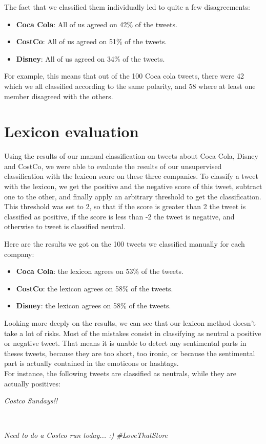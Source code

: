 \documentclass[a4paper,12pt]{report}
\begin{document}
The fact that we classified them individually led to quite a few disagreements:

\begin{itemize}
        \item \textbf{Coca Cola}: All of us agreed on 42\% of the tweets.
        \item \textbf{CostCo}: All of us agreed on 51\% of the tweets.
        \item \textbf{Disney}: All of us agreed on 34\% of the tweets.
\end{itemize}

For example, this means that out of the 100 Coca cola tweets, there were 42 which we all classified according to the same polarity, and 58 where at least one member disagreed with the others.

\section{Lexicon evaluation}

Using the results of our manual classification on tweets about Coca Cola, Disney and CostCo, we were able to evaluate the results of our unsupervised classification with the lexicon score on these three companies.
To classify a tweet with the lexicon, we get the positive and the negative score of this tweet, subtract one to the other, and finally apply an arbitrary threshold to get the classification.
This threshold was set to 2, so that if the score is greater than 2 the tweet is classified as positive, if the score is less than -2 the tweet is negative, and otherwise to tweet is classified neutral.

Here are the results we got on the 100 tweets we classified manually for each company:
\begin{itemize}
        \item \textbf{Coca Cola}: the lexicon agrees on 53\% of the tweets.
        \item \textbf{CostCo}: the lexicon agrees on 58\% of the tweets.
        \item \textbf{Disney}: the lexicon agrees on 58\% of the tweets.
\end{itemize}
Looking more deeply on the results, we can see that our lexicon method doesn't take a lot of risks.
Most of the mistakes consist in classifying as neutral a positive or negative tweet. That means it is unable to detect any sentimental parts in theses tweets, because they are too short, too ironic, or because the sentimental part is actually contained in the emoticons or hashtags.\\
For instance, the following tweets are classified as neutrals, while they are actually positives:\\
\centerline{\textit{Costco Sundays!!}}\\
\centerline{\textit{Need to do a Costco run today... :) \#LoveThatStore}}
\end{document}
